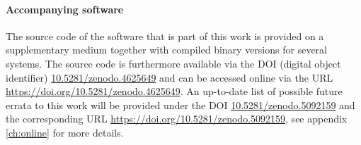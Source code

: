 \paragraph{Accompanying software}
The source code of the software that is part of this work is provided on a supplementary 
medium together with compiled binary versions for several systems.
The source code is furthermore available via the DOI (digital object identifier) 
\href{https://doi.org/10.5281/zenodo.4625649}{10.5281/zenodo.4625649} and can be
accessed online via the URL \url{https://doi.org/10.5281/zenodo.4625649}.
An up-to-date list of possible future errata to this work will be provided under the DOI
\href{https://doi.org/10.5281/zenodo.5092159}{10.5281/zenodo.5092159} and the corresponding URL
\url{https://doi.org/10.5281/zenodo.5092159},
see appendix \ref{ch:online} for more details.
